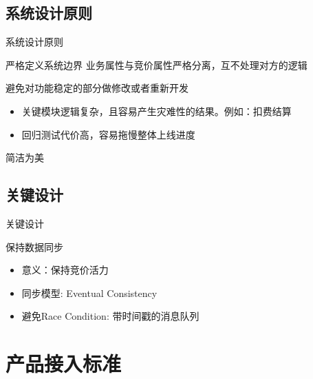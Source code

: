 \documentclass{beamer}
\begin{document}
\begin{CJK}{UTF8}{gbsn}
\subsection{系统设计原则}

\begin{frame}{系统设计原则}
  \begin{block}{严格定义系统边界}
    业务属性与竞价属性严格分离，互不处理对方的逻辑
    \pause
  \end{block}
  \begin{block}{避免对功能稳定的部分做修改或者重新开发}
    \begin{itemize}
      \item {
        关键模块逻辑复杂，且容易产生灾难性的结果。例如：扣费结算
      }
      \item {
        回归测试代价高，容易拖慢整体上线进度
      }
    \end{itemize}
    \pause
  \end{block}
  \begin{block}{简洁为美}
    
  \end{block}
\end{frame}

\subsection{关键设计}

\begin{frame}{关键设计}
  \begin{block}{保持数据同步}
    \begin{itemize}
      \item {
        意义：保持竞价活力
      }
      \item {同步模型: Eventual Consistency}
      \item {避免Race Condition: 带时间戳的消息队列}
    \end{itemize}
  \end{block}
\end{frame}

\section{产品接入标准}


\end{CJK}
\end{document}
